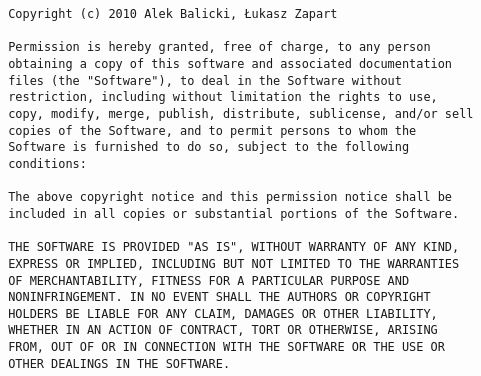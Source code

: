 \begin{verbatim}
 Copyright (c) 2010 Alek Balicki, Łukasz Zapart

 Permission is hereby granted, free of charge, to any person
 obtaining a copy of this software and associated documentation
 files (the "Software"), to deal in the Software without
 restriction, including without limitation the rights to use,
 copy, modify, merge, publish, distribute, sublicense, and/or sell
 copies of the Software, and to permit persons to whom the
 Software is furnished to do so, subject to the following
 conditions:

 The above copyright notice and this permission notice shall be
 included in all copies or substantial portions of the Software.

 THE SOFTWARE IS PROVIDED "AS IS", WITHOUT WARRANTY OF ANY KIND,
 EXPRESS OR IMPLIED, INCLUDING BUT NOT LIMITED TO THE WARRANTIES
 OF MERCHANTABILITY, FITNESS FOR A PARTICULAR PURPOSE AND
 NONINFRINGEMENT. IN NO EVENT SHALL THE AUTHORS OR COPYRIGHT
 HOLDERS BE LIABLE FOR ANY CLAIM, DAMAGES OR OTHER LIABILITY,
 WHETHER IN AN ACTION OF CONTRACT, TORT OR OTHERWISE, ARISING
 FROM, OUT OF OR IN CONNECTION WITH THE SOFTWARE OR THE USE OR
 OTHER DEALINGS IN THE SOFTWARE.
\end{verbatim}
